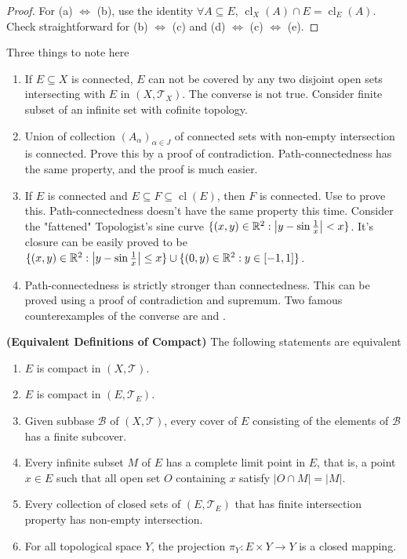 \documentclass{report}
\begin{document}
\begin{proof}
For (a) $\iff$ (b), use the identity $\forall A \subseteq E$, $\operatorname{cl}_X(A) \cap E = \operatorname{cl}_E(A)$. Check straightforward for (b) $\iff$ (c) and (d) $\iff$ (c) $\iff$ (e).
\end{proof}
\begin{mdframed}
Three things to note here
\begin{enumerate}[label=(\alph*)]
    \item If $E \subseteq X$ is connected, $E$ can not be covered by any two disjoint open sets intersecting with $E$ in $(X, \mathscr{T}_X)$. The converse is not true. Consider finite subset of an infinite set with cofinite topology.
    \item Union of collection $(A_\alpha)_{\alpha \in J}$ of connected sets with non-empty intersection is connected. Prove this by a proof of contradiction. Path-connectedness has the same property, and the proof is much easier.
    \item If $E$ is connected and $E \subseteq F \subseteq \operatorname{cl}(E)$, then $F$ is connected. Use  to prove this. Path-connectedness doesn't have the same property this time. Consider the "fattened" Topologist’s sine curve $\{ (x, y) \in \mathbb{R}^2 : \left| y - \sin \frac{1}{x} \right| < x \}$. It’s closure can be easily proved to be $\{ (x, y) \in \mathbb{R}^2 : \left| y - \sin \frac{1}{x} \right| \leq x \} \cup \{ (0, y) \in \mathbb{R}^2 : y \in [-1, 1] \}$.
    \item Path-connectedness is strictly stronger than connectedness. This can be proved using a proof of contradiction and supremum. Two famous counterexamples of the converse are  and .
\end{enumerate}
\end{mdframed}
\begin{theorem}
\textbf{(Equivalent Definitions of Compact)} The following statements are equivalent
\begin{enumerate}[label=(\alph*)]
    \item $E$ is compact in $(X, \mathscr{T})$. 
    \item $E$ is compact in $(E, \mathscr{T}_E)$. 
    \item Given subbase $\mathcal{B}$ of $(X, \mathscr{T})$, every cover of $E$ consisting of the elements of $\mathcal{B}$ has a finite subcover. 
    \item Every infinite subset $M$ of $E$ has a complete limit point in $E$, that is, a point $x \in E$ such that all open set $O$ containing $x$ satisfy $|O \cap M| = |M|$. 
    \item Every collection of closed sets of $(E, \mathscr{T}_E)$ that has finite intersection property has non-empty intersection. 
    \item For all topological space $Y$, the projection $\pi_Y : E \times Y \to Y$ is a closed mapping.
\end{enumerate}
\end{theorem}
\end{document}
